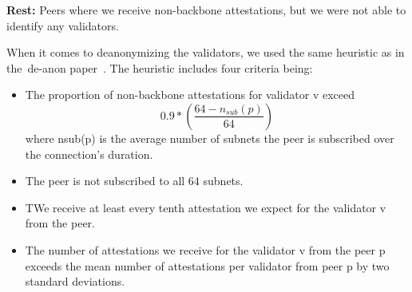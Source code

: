 \textbf{Rest:} Peers where we receive non-backbone attestations, but we were not able to identify any validators.

When it comes to deanonymizing the validators,
we used the same heuristic as in the~\gls{de-anon paper}~\cite{heimbach2024deanonymizingethereumvalidatorsp2p}.
The heuristic includes four criteria being:
\begin{itemize}
    \item The proportion of non-backbone attestations for validator v exceed
    \begin{equation}
        0.9*\left(\frac{64-n_{sub}(p)}{64}\right)
        \label{eq:heurestic}
    \end{equation} where nsub(p) is the average number of subnets the peer is subscribed over the connection’s duration.
    \item The peer is not subscribed to all 64 subnets.
    \item TWe receive at least every tenth attestation we expect for the validator v from the peer.
    \item The number of attestations we receive for the validator v from the peer p exceeds the mean number of attestations per validator from peer p by two standard deviations.
\end{itemize}